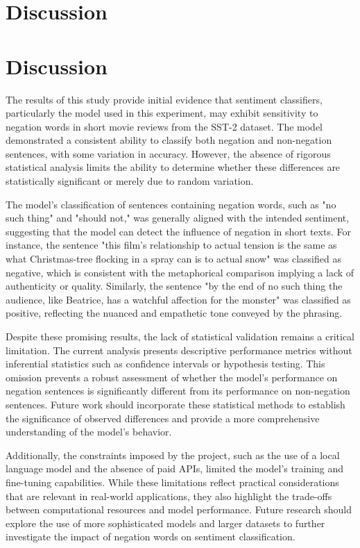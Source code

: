 \documentclass{article}
\begin{document}
\section{Discussion}
\section*{Discussion}

The results of this study provide initial evidence that sentiment classifiers, particularly the model used in this experiment, may exhibit sensitivity to negation words in short movie reviews from the SST-2 dataset. The model demonstrated a consistent ability to classify both negation and non-negation sentences, with some variation in accuracy. However, the absence of rigorous statistical analysis limits the ability to determine whether these differences are statistically significant or merely due to random variation.

The model's classification of sentences containing negation words, such as "no such thing" and "should not," was generally aligned with the intended sentiment, suggesting that the model can detect the influence of negation in short texts. For instance, the sentence "this film's relationship to actual tension is the same as what Christmas-tree flocking in a spray can is to actual snow" was classified as negative, which is consistent with the metaphorical comparison implying a lack of authenticity or quality. Similarly, the sentence "by the end of no such thing the audience, like Beatrice, has a watchful affection for the monster" was classified as positive, reflecting the nuanced and empathetic tone conveyed by the phrasing.

Despite these promising results, the lack of statistical validation remains a critical limitation. The current analysis presents descriptive performance metrics without inferential statistics such as confidence intervals or hypothesis testing. This omission prevents a robust assessment of whether the model's performance on negation sentences is significantly different from its performance on non-negation sentences. Future work should incorporate these statistical methods to establish the significance of observed differences and provide a more comprehensive understanding of the model's behavior.

Additionally, the constraints imposed by the project, such as the use of a local language model and the absence of paid APIs, limited the model's training and fine-tuning capabilities. While these limitations reflect practical considerations that are relevant in real-world applications, they also highlight the trade-offs between computational resources and model performance. Future research should explore the use of more sophisticated models and larger datasets to further investigate the impact of negation words on sentiment classification.
\end{document}
